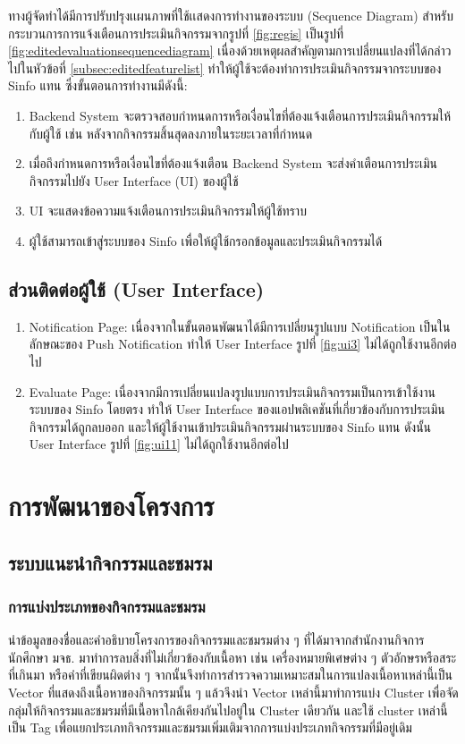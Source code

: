 \documentclass[14pt,oneside,openright,a4paper]{cpe-thai-project}
\begin{document}
  ทางผู้จัดทําได้มีการปรับปรุงเเผนภาพที่ใช้เเสดงการทำงานของระบบ (Sequence Diagram) สำหรับกระบวนการการแจ้งเตือนการประเมินกิจกรรมจากรูปที่ \ref{fig:regis} เป็นรูปที่ \ref{fig:editedevaluationsequencediagram} เนื่องด้วยเหตุผลสําคัญตามการเปลี่ยนแปลงที่ได้กล่าวไปในหัวข้อที่ \ref{subsec:editedfeaturelist} ทำให้ผู้ใช้จะต้องทำการประเมินกิจกรรมจากระบบของ Sinfo แทน 
  ซึ่งขั้นตอนการทำงานมีดังนี้:
  \begin{enumerate}
    \item Backend System จะตรวจสอบกำหนดการหรือเงื่อนไขที่ต้องแจ้งเตือนการประเมินกิจกรรมให้กับผู้ใช้ เช่น หลังจากกิจกรรมสิ้นสุดลงภายในระยะเวลาที่กำหนด
    \item เมื่อถึงกำหนดการหรือเงื่อนไขที่ต้องแจ้งเตือน Backend System จะส่งคำเตือนการประเมินกิจกรรมไปยัง User Interface (UI) ของผู้ใช้ 
    \item UI จะแสดงข้อความแจ้งเตือนการประเมินกิจกรรมให้ผู้ใช้ทราบ
    \item ผู้ใช้สามารถเข้าสู่ระบบของ Sinfo เพื่อให้ผู้ใช้กรอกข้อมูลและประเมินกิจกรรมได้
  \end{enumerate}
  \subsection{ส่วนติดต่อผู้ใช้ (User Interface)}
  \begin{enumerate}
    \item Notification Page: เนื่องจากในขั้นตอนพัฒนาได้มีการเปลี่ยนรูปแบบ Notification เป็นในลักษณะของ Push Notification ทำให้ User Interface รูปที่ \ref{fig:ui3} ไม่ได้ถูกใช้งานอีกต่อไป
    \item Evaluate Page: เนื่องจากมีการเปลี่ยนแปลงรูปแบบการประเมินกิจกรรมเป็นการเข้าใช้งานระบบของ Sinfo โดยตรง ทำให้ User Interface ของแอปพลิเคชันที่เกี่ยวข้องกับการประเมินกิจกรรมได้ถูกลบออก และให้ผู้ใช้งานเข้าประเมินกิจกรรมผ่านระบบของ Sinfo แทน ดังนั้น User Interface รูปที่ \ref{fig:ui11} ไม่ได้ถูกใช้งานอีกต่อไป
  \end{enumerate}
  \newpage
  
  \section{การพัฒนาของโครงการ}
  \subsection{ระบบแนะนำกิจกรรมและชมรม} \label{section:ML}
  \subsubsection{การแบ่งประเภทของกิจกรรมและชมรม}
    นำข้อมูลของชื่อและคำอธิบายโครงการของกิจกรรมและชมรมต่าง ๆ ที่ได้มาจากสำนักงานกิจการนักศึกษา มจธ. มาทำการลบสิ่งที่ไม่เกี่ยวข้องกับเนื้อหา เช่น เครื่องหมายพิเศษต่าง ๆ ตัวอักษรหรือสระที่เกินมา หรือคำที่เขียนผิดต่าง ๆ จากนั้นจึงทำการสำรวจความเหมาะสมในการแปลงเนื้อหาเหล่านี้เป็น Vector ที่แสดงถึงเนื้อหาของกิจกรรมนั้น ๆ แล้วจึงนำ Vector เหล่านี้มาทำการแบ่ง Cluster เพื่อจัดกลุ่มให้กิจกรรมและชมรมที่มีเนื้อหาใกล้เคียงกันไปอยู่ใน Cluster เดียวกัน และใช้ cluster เหล่านี้เป็น Tag เพื่อแยกประเภทกิจกรรมและชมรมเพิ่มเติมจากการแบ่งประเภทกิจกรรมที่มีอยู่เดิม
\end{document}
